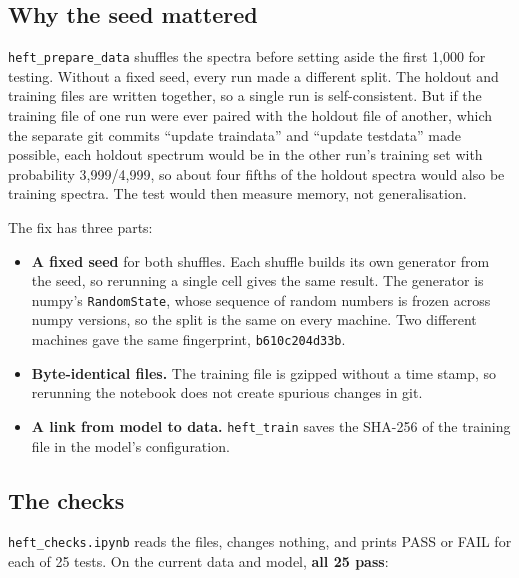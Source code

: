 \documentclass[11pt]{article}
\newcommand{\code}[1]{\texttt{#1}}
\begin{document}
\subsection{Why the seed mattered}

\code{heft\_prepare\_data} shuffles the spectra before setting aside the first 1,000
for testing. Without a fixed seed, every run made a different split. The holdout and
training files are written together, so a single run is self-consistent. But if the
training file of one run were ever paired with the holdout file of another, which
the separate git commits ``update traindata'' and ``update testdata'' made possible,
each holdout spectrum would be in the other run's training set with probability 3,999/4,999, so about four fifths of the holdout spectra would also be training spectra. The test would
then measure memory, not generalisation.

The fix has three parts:
\begin{itemize}
  \item \textbf{A fixed seed} for both shuffles. Each shuffle builds its own generator
  from the seed, so rerunning a single cell gives the same result. The generator is
  numpy's \code{RandomState}, whose sequence of random numbers is frozen across numpy
  versions, so the split is the same on every machine. Two different machines
  gave the same fingerprint, \code{b610c204d33b}.
  \item \textbf{Byte-identical files.} The training file is gzipped without a time
  stamp, so rerunning the notebook does not create spurious changes in git.
  \item \textbf{A link from model to data.} \code{heft\_train} saves the SHA-256 of
  the training file in the model's configuration.
\end{itemize}

\subsection{The checks}

\code{heft\_checks.ipynb} reads the files, changes nothing, and prints PASS or FAIL
for each of 25 tests. On the current data and model, \textbf{all 25 pass}:
\end{document}
